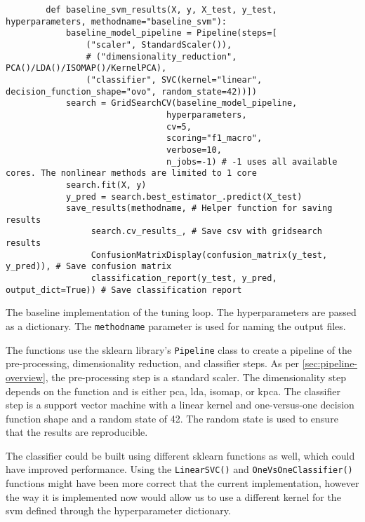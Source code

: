 \begin{listing}[htb!]
    \centering
    \begin{verbatim}
        def baseline_svm_results(X, y, X_test, y_test, hyperparameters, methodname="baseline_svm"):
            baseline_model_pipeline = Pipeline(steps=[
                ("scaler", StandardScaler()),
                # ("dimensionality_reduction", PCA()/LDA()/ISOMAP()/KernelPCA),
                ("classifier", SVC(kernel="linear", decision_function_shape="ovo", random_state=42))])
            search = GridSearchCV(baseline_model_pipeline,
                                hyperparameters,
                                cv=5,
                                scoring="f1_macro",
                                verbose=10,
                                n_jobs=-1) # -1 uses all available cores. The nonlinear methods are limited to 1 core
            search.fit(X, y)
            y_pred = search.best_estimator_.predict(X_test)
            save_results(methodname, # Helper function for saving results
                 search.cv_results_, # Save csv with gridsearch results
                 ConfusionMatrixDisplay(confusion_matrix(y_test, y_pred)), # Save confusion matrix
                 classification_report(y_test, y_pred, output_dict=True)) # Save classification report
    \end{verbatim}
    \caption{The baseline implementation of the tuning loop. The hyperparameters are passed as a dictionary. The \texttt{methodname} parameter is used for naming the output files.}
    \label{lst:baseline-svm-results}
\end{listing}


The functions use the \gls{sklearn} library's \texttt{Pipeline} class to create a pipeline of the pre-processing, dimensionality reduction, and classifier steps. As per \autoref{sec:pipeline-overview}, the pre-processing step is a standard scaler. The dimensionality step depends on the function and is either \gls{pca}, \gls{lda}, \gls{isomap}, or \gls{kpca}. The classifier step is a support vector machine with a linear kernel and one-versus-one decision function shape and a random state of 42. The random state is used to ensure that the results are reproducible.

The classifier could be built using different \gls{sklearn} functions as well, which could have improved performance. Using the \texttt{LinearSVC()} and \texttt{OneVsOneClassifier()} functions might have been more correct that the current implementation, however the way it is implemented now would allow us to use a different kernel for the \gls{svm} defined through the hyperparameter dictionary.

